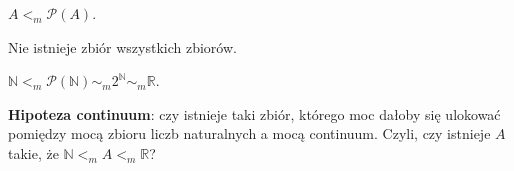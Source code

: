 	\begin{tw}[Cantora]
		$A  <_m  \mathcal{P} (A)$.
	\end{tw}
	
	\begin{tw}
		Nie istnieje zbiór wszystkich zbiorów.
	\end{tw}
	
	\begin{tw}
		$\mathbb{N}  <_m   \mathcal{P} (\mathbb{N})  \sim_m  2^{\mathbb{N}}  \sim_m  \mathbb{R}$.
	\end{tw}
	\textbf{Hipoteza continuum}: czy istnieje taki zbiór, którego moc dałoby się ulokować pomiędzy mocą zbioru liczb naturalnych a mocą continuum. Czyli, czy istnieje $A$ takie, że $\mathbb{N}  <_m  A  <_m  \mathbb{R}$?